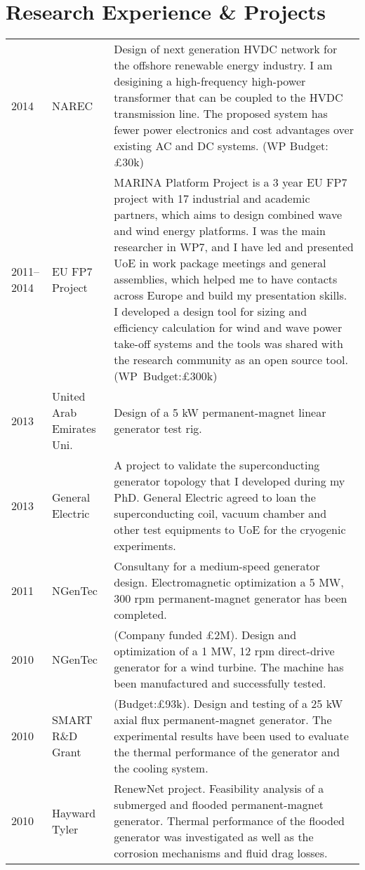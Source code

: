 \documentclass[a4paper,12pt]{article}
\begin{document}
\clearpage

\section{Research Experience \& Projects}
\begin{longtable}{lp{3cm}p{12cm}}
2014 & NAREC & Design of next generation HVDC network for the offshore renewable energy industry. I am desigining a high-frequency high-power transformer that can be coupled to the HVDC transmission line. The proposed system has fewer power electronics and cost advantages over existing AC and DC systems. (WP Budget:£30k)\\
2011--2014 & EU FP7 Project &  MARINA Platform Project is a 3 year EU FP7 project with 17 industrial and academic partners, which aims to design combined wave and wind energy platforms. I was the main researcher in WP7, and I have led and presented UoE in work package meetings and general assemblies, which helped me to have contacts across Europe and build my presentation skills. I developed a design tool for sizing and efficiency calculation for wind and wave power take-off systems and the tools was shared with the research community as an open source tool. (WP~Budget:£300k)\\
2013 & United Arab Emirates Uni. & Design of a 5 kW permanent-magnet linear generator test rig.\\
2013 & General Electric & A project to validate the superconducting generator topology that I developed during my PhD. General Electric agreed to loan the superconducting coil, vacuum chamber and other test equipments to UoE for the cryogenic experiments.\\
2011 & NGenTec & Consultany for a medium-speed generator design. Electromagnetic optimization a 5 MW, 300 rpm permanent-magnet generator has been completed.\\
2010 & NGenTec & (Company funded £2M). Design and optimization of a 1 MW, 12 rpm direct-drive generator for a wind turbine. The machine has been manufactured and successfully tested.\\
2010 & SMART R\&D Grant & (Budget:£93k). Design and testing of a 25 kW axial flux permanent-magnet generator. The experimental results have been used to evaluate the thermal performance of the generator and the cooling system.\\
2010 & Hayward Tyler & RenewNet project. Feasibility analysis of a submerged and flooded permanent-magnet generator. Thermal performance of the flooded generator was investigated as well as the corrosion mechanisms and fluid drag losses.\\

\end{longtable}
\end{document}
